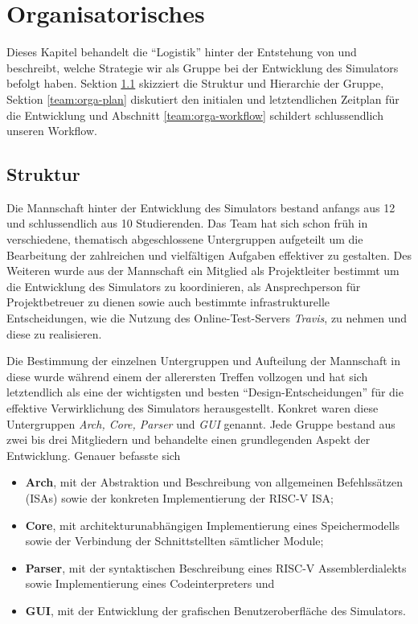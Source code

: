 
\section{Organisatorisches}
\label{team:orga}

Dieses Kapitel behandelt die ``Logistik'' hinter der Entstehung von \erasim{} und
beschreibt, welche Strategie wir als Gruppe bei der Entwicklung des Simulators
befolgt haben. Sektion \ref{team:orga-structure} skizziert die Struktur und
Hierarchie der Gruppe, Sektion \ref{team:orga-plan} diskutiert den initialen und
letztendlichen Zeitplan für die Entwicklung und Abschnitt
\ref{team:orga-workflow} schildert schlussendlich unseren Workflow.

\subsection{Struktur}
\label{team:orga-structure}

Die Mannschaft hinter der Entwicklung des \erasim{} Simulators bestand anfangs aus
12 und schlussendlich aus 10 Studierenden. Das Team hat sich schon früh in
verschiedene, thematisch abgeschlossene Untergruppen aufgeteilt um die
Bearbeitung der zahlreichen und vielfältigen Aufgaben effektiver zu gestalten.
Des Weiteren wurde aus der Mannschaft ein Mitglied als Projektleiter bestimmt um
die Entwicklung des Simulators zu koordinieren, als Ansprechperson für
Projektbetreuer zu dienen sowie auch bestimmte infrastrukturelle Entscheidungen, wie die Nutzung des Online-Test-Servers \emph{Travis}, zu nehmen und diese zu realisieren.

Die Bestimmung der einzelnen Untergruppen und Aufteilung der Mannschaft in diese
wurde während einem der allerersten Treffen vollzogen und hat sich letztendlich
als eine der wichtigsten und besten ``Design-Entscheidungen'' für die effektive
Verwirklichung des Simulators herausgestellt. Konkret waren diese Untergruppen
\emph{Arch, Core, Parser} und \emph{GUI} genannt. Jede Gruppe bestand aus zwei
bis drei Mitgliedern und behandelte einen grundlegenden Aspekt der Entwicklung.
Genauer befasste sich

\begin{itemize}
  \item \textbf{Arch}, mit der Abstraktion und Beschreibung von allgemeinen Befehlssätzen (ISAs) sowie der konkreten Implementierung der RISC-V ISA;
  \item \textbf{Core}, mit architekturunabhängigen Implementierung eines Speichermodells sowie der Verbindung der Schnittstellten sämtlicher Module;
  \item \textbf{Parser}, mit der syntaktischen Beschreibung eines RISC-V Assemblerdialekts sowie Implementierung eines Codeinterpreters und
  \item \textbf{GUI}, mit der Entwicklung der grafischen Benutzeroberfläche des Simulators.
\end{itemize}

